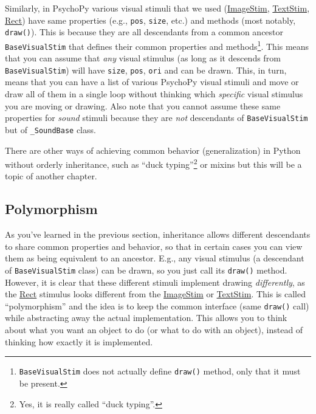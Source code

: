 \documentclass[
]{book}
\begin{document}
Similarly, in PsychoPy various visual stimuli that we used (\href{https://psychopy.org/api/visual/imagestim.html\#psychopy.visual.ImageStim}{ImageStim}, \href{https://psychopy.org/api/visual/textstim.html\#psychopy.visual.TextStim}{TextStim}, \href{https://psychopy.org/api/visual/rect.html\#psychopy.visual.rect.Rect}{Rect}) have same properties (e.g., \texttt{pos}, \texttt{size}, etc.) and methods (most notably, \texttt{draw()}). This is because they are all descendants from a common ancestor \texttt{BaseVisualStim} that defines their common properties and methods\footnote{\texttt{BaseVisualStim} does not actually define \texttt{draw()} method, only that it must be present.}. This means that you can assume that \emph{any} visual stimulus (as long as it descends from \texttt{BaseVisualStim}) will have \texttt{size}, \texttt{pos}, \texttt{ori} and can be drawn. This, in turn, means that you can have a list of various PsychoPy visual stimuli and move or draw all of them in a single loop without thinking which \emph{specific} visual stimulus you are moving or drawing. Also note that you cannot assume these same properties for \emph{sound} stimuli because they are \emph{not} descendants of \texttt{BaseVisualStim} but of \texttt{\_SoundBase} class.

There are other ways of achieving common behavior (generalization) in Python without orderly inheritance, such as ``duck typing''\footnote{Yes, it is really called ``duck typing''.} or mixins but this will be a topic of another chapter.

\hypertarget{polymorphism}{%
\subsection{Polymorphism}\label{polymorphism}}

As you've learned in the previous section, inheritance allows different descendants to share common properties and behavior, so that in certain cases you can view them as being equivalent to an ancestor. E.g., any visual stimulus (a descendant of \texttt{BaseVisualStim} class) can be drawn, so you just call its \texttt{draw()} method. However, it is clear that these different stimuli implement drawing \emph{differently}, as the \href{https://psychopy.org/api/visual/rect.html\#psychopy.visual.rect.Rect}{Rect} stimulus looks different from the \href{https://psychopy.org/api/visual/imagestim.html\#psychopy.visual.ImageStim}{ImageStim} or \href{https://psychopy.org/api/visual/textstim.html\#psychopy.visual.TextStim}{TextStim}. This is called ``polymorphism'' and the idea is to keep the common interface (same \texttt{draw()} call) while abstracting away the actual implementation. This allows you to think about what you want an object to do (or what to do with an object), instead of thinking how exactly it is implemented.
\end{document}
